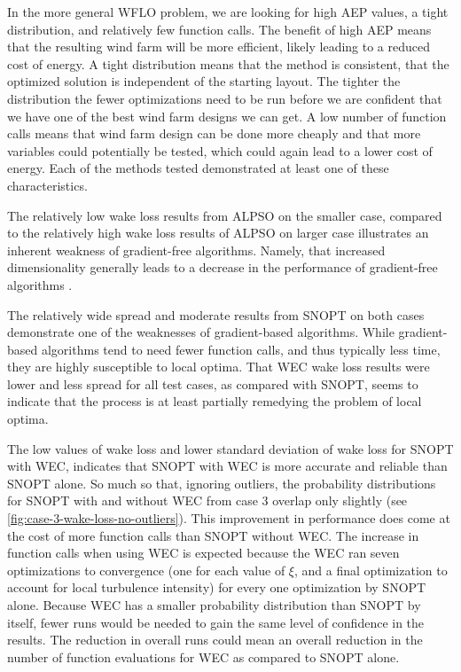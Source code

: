 \documentclass[a4paper]{jpconf}
\begin{document}
In the more general WFLO problem, we are looking for high AEP values, a tight distribution, and relatively few function calls. The benefit of high AEP means that the resulting wind farm will be more efficient, likely leading to a reduced cost of energy. A tight distribution means that the method is consistent, that the optimized solution is independent of the starting layout. The tighter the distribution the fewer optimizations need to be run before we are confident that we have one of the best wind farm designs we can get. A low number of function calls means that wind farm design can be done more cheaply and that more variables could potentially be tested, which could again lead to a lower cost of energy. Each of the methods tested demonstrated at least one of these characteristics.

The relatively low wake loss results from ALPSO on the smaller case, compared to the relatively high wake loss results of ALPSO on larger case illustrates an inherent weakness of gradient-free algorithms. Namely, that increased dimensionality generally leads to a decrease in the performance of gradient-free algorithms \cite{rios2013-grad-free-comparison}.

The relatively wide spread and moderate results from SNOPT on both cases demonstrate one of the weaknesses of gradient-based algorithms. While gradient-based algorithms tend to need fewer function calls, and thus typically less time, they are highly susceptible to local optima. That WEC wake loss results were lower and less spread for all test cases, as compared with SNOPT, seems to indicate that the process is at least partially remedying the problem of local optima.

The low values of wake loss and lower standard deviation of wake loss for SNOPT with WEC, indicates that SNOPT with WEC is more accurate and reliable than SNOPT alone. So much so that, ignoring outliers, the probability distributions for SNOPT with and without WEC from case 3 overlap only slightly (see \cref{fig:case-3-wake-loss-no-outliers}). This improvement in performance does come at the cost of more function calls than SNOPT without WEC. The increase in function calls when using WEC is expected because the WEC ran seven optimizations to convergence (one for each value of $\xi$, and a final optimization to account for local turbulence intensity) for every one optimization by SNOPT alone. Because WEC has a smaller probability distribution than SNOPT by itself, fewer runs would be needed to gain the same level of confidence in the results. The reduction in overall runs could mean an overall reduction in the number of function evaluations for WEC as compared to SNOPT alone.
\end{document}
